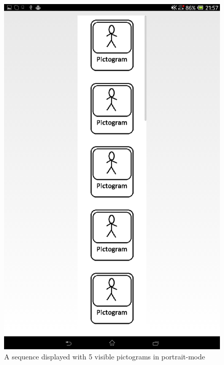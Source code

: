 \begin{figure}[h!]
\begin{minipage}{.45\textwidth}
\centering
\includegraphics[scale=0.1]{Pics/Sprint3/portrait5pics.png}
\caption{A sequence displayed with 5 visible pictograms in portrait-mode}
\label{fig:portrait5pics}
\end{minipage}
\end{figure}















